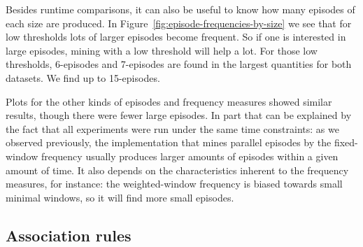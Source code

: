 Besides runtime comparisons, it can also be useful to know how many episodes of each size are produced. In Figure~\ref{fig:episode-frequencies-by-size} we see that for low thresholds lots of larger episodes become frequent. So if one is interested in large episodes, mining with a low threshold will help a lot. For those low thresholds, 6-episodes and 7-episodes are found in the largest quantities for both datasets. We find up to 15-episodes.

Plots for the other kinds of episodes and frequency measures showed similar results, though there were fewer large episodes. In part that can be explained by the fact that all experiments were run under the same time constraints: as we observed previously, the implementation that mines parallel episodes by the fixed-window frequency usually produces larger amounts of episodes within a given amount of time. It also depends on the characteristics inherent to the frequency measures, for instance: the weighted-window frequency is biased towards small minimal windows, so it will find more small episodes.


\subsection{Association rules}
\label{sec:performance-rules}

